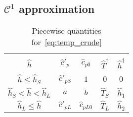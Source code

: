 \documentclass{article}
\begin{document}
\subsection{\(\mathcal{C}^1\) approximation}

\begin{table}[ht]
    \centering
    \caption{Piecewise quantities for~\eqref{eq:temp_crude}}
    \label{table:temp_params}
    \begin{tabular}{c|cccc}
        \hline\\[-1em]
        \(\hat{h}\)                         & \(\hat{c}'_p\)    & \(\hat{c}_{p0}\)  & \(\hat{T}^\dag\) & \(\hat{h}^\dag\) \\[0.3em]
        \hline\\[-1em]
        \(\hat{h} \leq \hat{h}_S\)          & \(\hat{c}'_{pS}\) & \(1\)             & \(0\)            & \(0\)            \\[0.3em]
        \(\hat{h}_S < \hat{h} < \hat{h}_L\) & \(a\)             & \(b\)             & \(\hat{T}_S\)    & \(\hat{h}_1\)    \\[0.3em]
        \(\hat{h}_L \leq \hat{h}\)          & \(\hat{c}'_{pL}\) & \(\hat{c}_{pL0}\) & \(\hat{T}_L\)    & \(\hat{h}_2\)    \\[0.3em]
        \hline
    \end{tabular}
\end{table}
\end{document}
